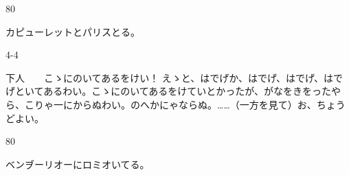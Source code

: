 \documentclass[tate,paper=b6j,jafontsize=9pt]{jlreq}
\begin{document}
\begin{azconvIndented}{8\zw}{0\zw}

カピューレットとパリスとる。

\end{azconvIndented}
\begin{azconvIndented}{4\zw}{-4\zw}

下人　　こゝにのいてあるをけい！ えゝと、はでげか、はでげ、はでげ、はでげといてあるわい。こゝにのいてあるをけていとかったが、がなをきをったやら、こりゃ一にからぬわい。のへかにゃならぬ。……（一方を見て）お、ちょうどよい。

\end{azconvIndented}
\begin{azconvIndented}{8\zw}{0\zw}

ベンヺーリオーにロミオいてる。

\end{azconvIndented}
\end{document}
